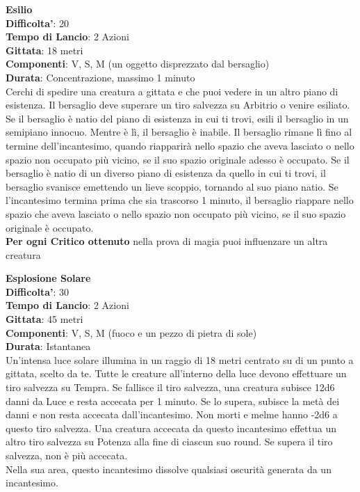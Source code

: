 \begin{multicols}{2}
\medskip\textbf{Esilio}\\
\textbf{Difficolta'}: 20\\
\textbf{Tempo di Lancio}: 2 Azioni\\
\textbf{Gittata}: 18 metri\\
\textbf{Componenti}: V, S, M (un oggetto disprezzato dal bersaglio)\\
\textbf{Durata}: Concentrazione, massimo 1 minuto\\
Cerchi di spedire una creatura a gittata e che puoi vedere in un altro piano di esistenza. Il bersaglio deve superare un tiro salvezza su Arbitrio o venire esiliato. Se il bersaglio è natio del piano di esistenza in cui ti trovi, esili il bersaglio in un semipiano innocuo. Mentre è lì, il bersaglio è inabile. Il bersaglio rimane lì fino al termine dell’incantesimo, quando riapparirà nello spazio che aveva lasciato o nello spazio non occupato più vicino, se il suo spazio originale adesso è occupato. Se il bersaglio è natio di un diverso piano di esistenza da quello in cui ti trovi, il bersaglio svanisce emettendo un lieve scoppio, tornando al suo piano natio. Se l’incantesimo termina prima che sia trascorso 1 minuto, il bersaglio riappare nello spazio che aveva lasciato o nello spazio non occupato più vicino, se il suo spazio originale è occupato.\\
\textbf{Per ogni Critico ottenuto} nella prova di magia puoi influenzare un altra creatura

\medskip\textbf{Esplosione Solare}\\
\textbf{Difficolta'}: 30\\
\textbf{Tempo di Lancio}: 2 Azioni\\
\textbf{Gittata}: 45 metri\\
\textbf{Componenti}: V, S, M (fuoco e un pezzo di pietra di sole)\\
\textbf{Durata}: Istantanea\\
Un’intensa luce solare illumina in un raggio di 18 metri centrato su di un punto a gittata, scelto da te. Tutte le creature all’interno della luce devono effettuare un tiro salvezza su Tempra. Se fallisce il tiro salvezza, una creatura subisce 12d6 danni da Luce e resta accecata per 1 minuto. Se lo supera, subisce la metà dei danni e non resta accecata dall’incantesimo. Non morti e melme hanno -2d6 a questo tiro salvezza. Una creatura accecata da questo incantesimo effettua un altro tiro salvezza su Potenza alla fine di ciascun suo round. Se supera il tiro salvezza, non è più accecata.\\
Nella sua area, questo incantesimo dissolve qualsiasi oscurità generata da un incantesimo. 


\end{multicols}
